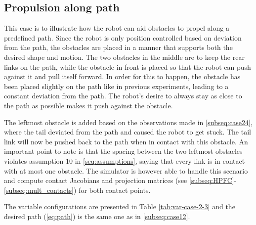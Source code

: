 

\subsection{Propulsion along path}\label{subseq:case23}

This case is to illustrate how the robot can aid obstacles to propel along a predefined path. Since the robot is only position controlled based on deviation from the path, the obstacles are placed in a manner that supports both the desired shape and motion. The two obstacles in the middle are to keep the rear links on the path, while the obstacle in front is placed so that the robot can push against it and pull itself forward. In order for this to happen, the obstacle has been placed slightly on the path like in previous experiments, leading to a constant deviation from the path. The robot's desire to always stay as close to the path as possible makes it push against the obstacle.

The leftmost obstacle is added based on the observations made in \ref{subseq:case24}, where the tail deviated from the path and caused the robot to get stuck. The tail link will now be pushed back to the path when in contact with this obstacle. An important point to note is that the spacing between the two leftmost obstacles violates assumption 10 in \ref{seq:assumptions}, saying that every link is in contact with at most one obstacle. The simulator is however able to handle this scenario and compute contact Jacobians and projection matrices (see \ref{subseq:HPFC}-\ref{subseq:mult_contacts}) for both contact points.

The variable configurations are presented in Table \ref{tab:var-case-2-3} and the desired path (\ref{eq:path}) is the same one as in \ref{subseq:case12}.


